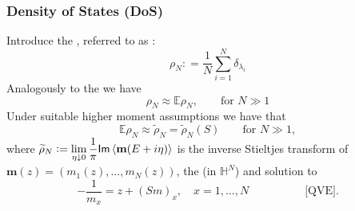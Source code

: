 \documentclass{beamer}
\numberwithin{equation}{section}
\newcommand{\deq}{\mathrel{\mathop:}=}
\renewcommand{\Im}{\mathsf{Im}\,}
\newcommand{\E}{{\mathbb E }}
\newcommand{\Cr}{\color{red}}
\renewcommand{\emph}[1]{{\Cr{#1}}}
\begin{document}
\begin{frame}
\frametitle{Density of States (DoS)}
Introduce the \emph{random measure}, referred to as \emph{empirical density}:
$$\rho_N\deq \frac{1}{N}\sum_{i=1}^N\delta_{\lambda_i}$$
Analogously to the \emph{law of large numbers} we have $$\rho_N\approx\E\rho_N,\quad\quad \text{for } N\gg 1$$
Under suitable higher moment assumptions we have that $$\E\rho_N \approx \widetilde\rho_N=\widetilde\rho_N(S)\quad\quad \text{for } N\gg 1,$$
where $\widetilde\rho_N\deq \displaystyle\lim_{\eta\downarrow 0} \frac{1}{\pi}\Im \langle{\bf m}(E+i\eta)\rangle$ is the inverse Stieltjes transform of $\mathbf m(z) = (m_1(z),\dots,m_N(z))$, the \emph{unique} (in $\mathbb H^N$) and \emph{deterministic} solution to $$-\frac{1}{m_x}=z+(Sm)_x,\quad x=1,\dots,N\quad\quad\quad\quad\quad \text{[QVE]}.$$
\end{frame}
\end{document}
